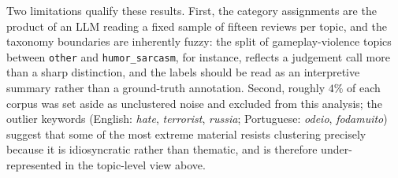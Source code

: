 Two limitations qualify these results. First, the category assignments are the product of an LLM reading a fixed sample of fifteen reviews per topic, and the taxonomy boundaries are inherently fuzzy: the split of gameplay-violence topics between \texttt{other} and \texttt{humor\_sarcasm}, for instance, reflects a judgement call more than a sharp distinction, and the labels should be read as an interpretive summary rather than a ground-truth annotation. Second, roughly $4\%$ of each corpus was set aside as unclustered noise and excluded from this analysis; the outlier keywords (English: \emph{hate}, \emph{terrorist}, \emph{russia}; Portuguese: \emph{odeio}, \emph{fodamuito}) suggest that some of the most extreme material resists clustering precisely because it is idiosyncratic rather than thematic, and is therefore under-represented in the topic-level view above.


